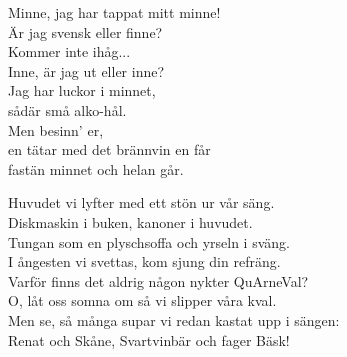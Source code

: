 \documentclass[a6paper,10pt]{article}
\begin{document}
\vspace{10pt}
\begin{center}
\end{center}
\begin{lyrics}
Minne, jag har tappat mitt minne! \\
Är jag svensk eller finne?\\
Kommer inte ihåg...
\vspace{5pt}\\
Inne, är jag ut eller inne?\\
Jag har luckor i minnet,\\
sådär små alko-hål.\\
Men besinn' er,\\
en tätar med det brännvin en får\\
fastän minnet och helan går. 
\end{lyrics}
\vspace{10pt}
\begin{center}
\end{center}
\begin{lyrics}
Huvudet vi lyfter med ett stön ur vår säng.\\
Diskmaskin i buken, kanoner i huvudet.\\
Tungan som en plyschsoffa och yrseln i sväng.\\
I ångesten vi svettas, kom sjung din refräng.
\vspace{5pt}\\
Varför finns det aldrig någon nykter QuArneVal?\\
O, låt oss somna om så vi slipper våra kval.\\
Men se, så många supar vi redan kastat upp i sängen:\\
Renat och Skåne, Svartvinbär och fager Bäsk! 
\end{lyrics}
\end{document}
